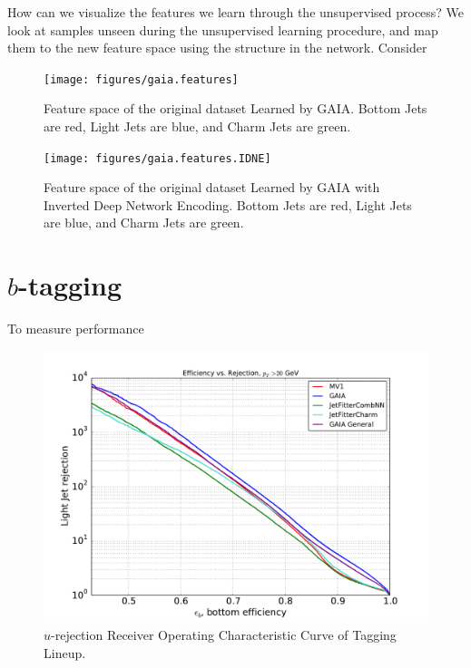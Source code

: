 How can we visualize the features we learn through the unsupervised process? We look at samples unseen during the unsupervised learning procedure, and map them to the new feature space using the structure in the network. Consider

\begin{figure}
\texttt{[image: figures/gaia.features]}
\caption[The ATLAS detector]{Feature space of the original dataset Learned by GAIA. Bottom Jets are red, Light Jets are blue, and Charm Jets are green.
\label{fig:featGAIA}}
\end{figure}

\begin{figure}
\texttt{[image: figures/gaia.features.IDNE]}
\caption[The ATLAS detector]{Feature space of the original dataset Learned by GAIA with Inverted Deep Network Encoding. Bottom Jets are red, Light Jets are blue, and Charm Jets are green.
\label{fig:featidne}}
\end{figure}




\section{$b$-tagging} 
\label{sec:btag}

To measure performance

\begin{figure}
\includegraphics[width=\textwidth]{figures/btag/u_rej_ROC.pdf}
\caption[The ATLAS detector]{$u$-rejection Receiver Operating Characteristic Curve of Tagging Lineup.
\label{fig:urejROC}}
\end{figure}

